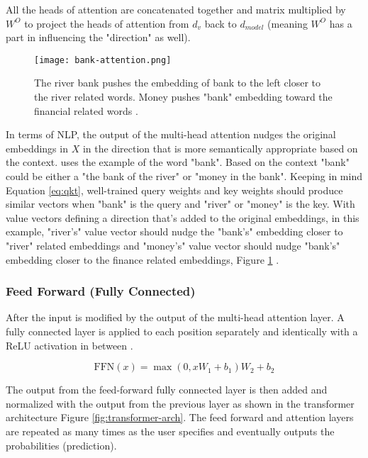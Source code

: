 All the heads of attention are concatenated together and matrix multiplied by $W^O$ to project the heads of attention from $d_v$ back to $d_{model}$ (meaning $W^O$ has a part in influencing the "direction" as well). 

\begin{figure}[ht]
    \centering
    \texttt{[image: bank-attention.png]}
    \caption{The river bank pushes the embedding of bank to the left closer to the river related words. Money pushes "bank" embedding toward the financial related words \cite{amanatullahAttentionMechanism2023}.}
    \label{fig:bank-attention}
\end{figure}

In terms of NLP, the output of the multi-head attention nudges the original embeddings in $X$ in the direction that is more semantically appropriate based on the context. \cite{amanatullahAttentionMechanism2023} uses the example of the word "bank". Based on the context "bank" could be either a "the bank of the river" or "money in the bank". Keeping in mind Equation \ref{eq:qkt}, well-trained query weights and key weights should produce similar vectors when "bank" is the query and "river" or "money" is the key. With value vectors defining a direction that's added to the original embeddings, in this example, "river's" value vector should nudge the "bank's" embedding closer to "river" related embeddings and "money's" value vector should nudge "bank's" embedding closer to the finance related embeddings, Figure \ref{fig:bank-attention} \cite{amanatullahAttentionMechanism2023}.

\subsubsection{Feed Forward (Fully Connected)}
After the input is modified by the output of the multi-head attention layer. A fully connected layer is applied to each position separately and identically with a ReLU activation in between \cite{vaswaniAttentionAllYou2023}.

\begin{equation}
    \text{FFN}(x) = \max{(0, xW_1 + b_1)}W_2 + b_2
\end{equation}
 
The output from the feed-forward fully connected layer is then added and normalized with the output from the previous layer as shown in the transformer architecture Figure \ref{fig:transformer-arch}. The feed forward and attention layers are repeated as many times as the user specifies and eventually outputs the probabilities (prediction). 

